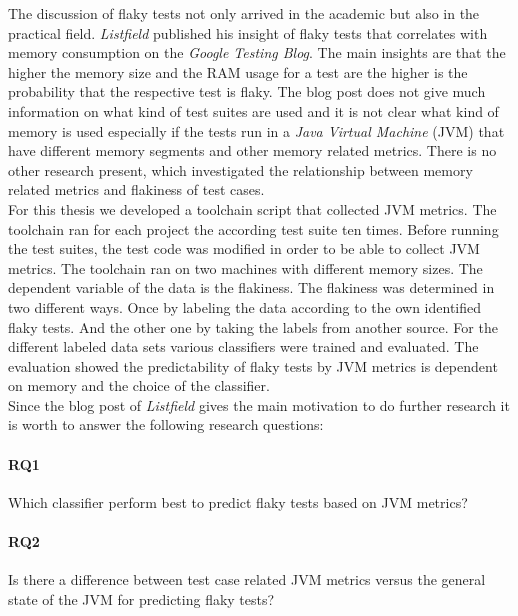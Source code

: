 \documentclass{seal_thesis}
\begin{document}
\noindent The discussion of flaky tests not only arrived in the academic but also in the practical field. \textit{Listfield} \cite{listfield17} published his insight of flaky tests that correlates with memory consumption on the \textit{Google Testing Blog}. The main insights are that the higher the memory size and the RAM usage for a test are the higher is the probability that the respective test is flaky. The blog post does not give much information on what kind of test suites are used and it is not clear what kind of memory is used especially if the tests run in a \textit{Java Virtual Machine} (JVM) that have different memory segments and other memory related metrics. There is no other research present, which investigated the relationship between memory related metrics and flakiness of test cases. \\

\noindent For this thesis we developed a toolchain script that collected JVM metrics. The toolchain ran for each project the according test suite ten times. Before running the test suites, the test code was modified in order to be able to collect JVM metrics. The toolchain ran on two machines with different memory sizes. The dependent variable of the data is the flakiness. The flakiness was determined in two different ways. Once by labeling the data according to the own identified flaky tests. And the other one by taking the labels from another source. For the different labeled data sets various classifiers were trained and evaluated. The evaluation showed the predictability of flaky tests by JVM metrics is dependent on memory and the choice of the classifier. \\

\noindent Since the blog post of \textit{Listfield} \cite{listfield17} gives the main motivation to do further research it is worth to answer the following research questions:



\paragraph{RQ1} Which classifier perform best to predict flaky tests based on JVM metrics?

\paragraph{RQ2} Is there a difference between test case related JVM metrics versus the general state of the JVM for predicting flaky tests?
\end{document}
